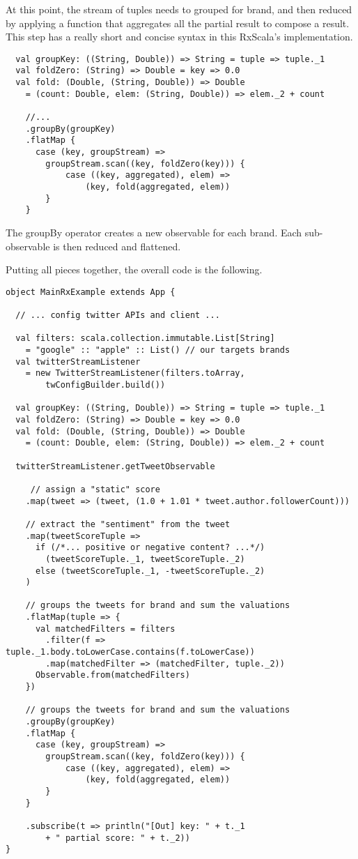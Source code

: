 At this point, the stream of tuples needs to grouped for brand, and then
reduced by applying a function that aggregates all the partial result to
compose a result. This step has a really short and concise syntax in
this RxScala's implementation.

\begin{verbatim}
  val groupKey: ((String, Double)) => String = tuple => tuple._1
  val foldZero: (String) => Double = key => 0.0
  val fold: (Double, (String, Double)) => Double
    = (count: Double, elem: (String, Double)) => elem._2 + count

    //...
    .groupBy(groupKey)
    .flatMap {
      case (key, groupStream) =>
        groupStream.scan((key, foldZero(key))) {
            case ((key, aggregated), elem) =>
                (key, fold(aggregated, elem))
        }
    }
\end{verbatim}

The groupBy operator creates a new observable for each brand. Each
sub-observable is then reduced and flattened.

Putting all pieces together, the overall code is the following.

\begin{verbatim}
object MainRxExample extends App {

  // ... config twitter APIs and client ...

  val filters: scala.collection.immutable.List[String]
    = "google" :: "apple" :: List() // our targets brands
  val twitterStreamListener
    = new TwitterStreamListener(filters.toArray, 
    	twConfigBuilder.build())

  val groupKey: ((String, Double)) => String = tuple => tuple._1
  val foldZero: (String) => Double = key => 0.0
  val fold: (Double, (String, Double)) => Double
    = (count: Double, elem: (String, Double)) => elem._2 + count

  twitterStreamListener.getTweetObservable

     // assign a "static" score
    .map(tweet => (tweet, (1.0 + 1.01 * tweet.author.followerCount)))

    // extract the "sentiment" from the tweet
    .map(tweetScoreTuple =>
      if (/*... positive or negative content? ...*/)
        (tweetScoreTuple._1, tweetScoreTuple._2)
      else (tweetScoreTuple._1, -tweetScoreTuple._2)
    )

    // groups the tweets for brand and sum the valuations
    .flatMap(tuple => {
      val matchedFilters = filters
        .filter(f => tuple._1.body.toLowerCase.contains(f.toLowerCase))
        .map(matchedFilter => (matchedFilter, tuple._2))
      Observable.from(matchedFilters)
    })

    // groups the tweets for brand and sum the valuations
    .groupBy(groupKey)
    .flatMap {
      case (key, groupStream) =>
        groupStream.scan((key, foldZero(key))) {
            case ((key, aggregated), elem) =>
                (key, fold(aggregated, elem))
        }
    }

    .subscribe(t => println("[Out] key: " + t._1
        + " partial score: " + t._2))
}
\end{verbatim}


